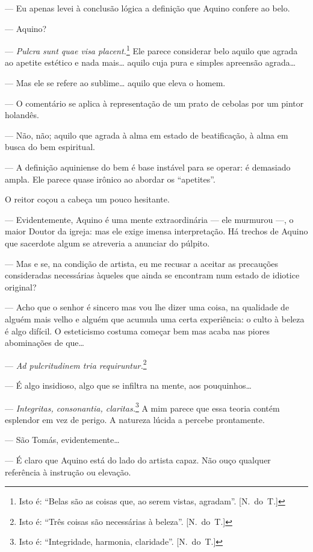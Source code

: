 --- Eu apenas levei à conclusão lógica a definição que Aquino
confere ao belo.

--- Aquino?

--- \textit{Pulcra sunt quae visa placent.}\footnote{ Isto é: 
“Belas são as coisas que, ao serem vistas, agradam”. [N.~do~T.]}
Ele parece considerar belo aquilo que agrada ao apetite estético e
nada mais\ldots{} aquilo cuja pura e simples apreensão agrada\ldots{}

--- Mas ele se refere ao sublime\ldots{} aquilo que eleva o homem.

--- O comentário se aplica à representação de um prato de cebolas
por um pintor holandês.

--- Não, não; aquilo que agrada à alma em estado de beatificação,		
à alma em busca do bem espiritual.

--- A definição aquiniense do bem é base instável para se operar:
é demasiado ampla.  Ele parece quase irônico ao abordar os “apetites”.

O reitor coçou a cabeça um pouco hesitante.

--- Evidentemente, Aquino é uma mente extraordinária --- ele
murmurou ---, o maior Doutor da igreja: mas ele exige imensa
interpretação.  Há trechos de Aquino que sacerdote algum se atreveria a
anunciar do púlpito.

--- Mas e se, na condição de artista, eu me recusar a aceitar as
precauções consideradas necessárias àqueles que ainda se encontram num
estado de idiotice original?

--- Acho que o senhor é sincero mas vou lhe dizer uma coisa, na
qualidade de alguém mais velho e alguém que acumula uma certa
experiência: o culto à beleza é algo difícil.  O esteticismo costuma
começar bem mas acaba nas piores abominações de que\ldots{}

--- \textit{Ad pulcritudinem tria requiruntur.}\footnote{ Isto é:
“Três coisas são necessárias à beleza”. [N.~do~T.]}

--- É algo insidioso, algo que se infiltra na mente, aos
pouquinhos\ldots{}

--- \textit{Integritas, consonantia, claritas.}\footnote{ Isto é:
“Integridade, harmonia, claridade”. [N.~do~T.]} A mim parece que		
essa teoria contém esplendor em vez de perigo.  A natureza lúcida a
percebe prontamente.

--- São Tomás, evidentemente\ldots{}

--- É claro que Aquino está do lado do artista capaz.  Não ouço
qualquer referência à instrução ou elevação.

